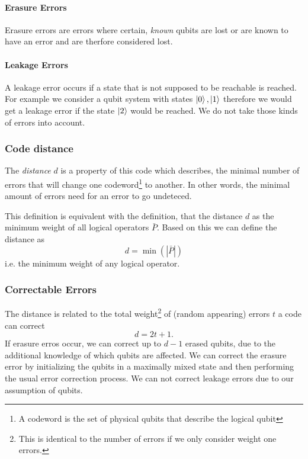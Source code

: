 \paragraph{Erasure Errors}
Erasure errors are errors where certain, \textit{known} qubits are lost or are known to have an error 
and are therfore considered lost. \cite{QECmemory}

\paragraph{Leakage Errors}
A leakage error occurs if a state that is not supposed to be reachable is reached. 
For example we consider a qubit system with states $\ket{0},\ket{1}$ therefore we would get a leakage error 
if the state $\ket{2}$ would be reached.
We do not take those kinds of errors into account.


\subsubsection{Code distance}\label{sec:code_distance}
The \textit{distance} $d$ is a property of this code which describes, 
the minimal number of errors that will change one 
codeword\footnote{A codeword is the set of physical qubits that describe the logical qubit} to another.
In other words, the minimal amount of errors need for an error to go undeteced. \cite{QECintro}

This definition is equivalent with the definition, 
that the distance $d$ as the minimum weight of all logical operators $\bar{P}$. 
Based on this we can define the distance as
\begin{equation}
    d = \min( |\bar{P}| )
\end{equation}
i.e. the minimum weight of any logical operator.\cite{QECmemory}


\subsubsection{Correctable Errors}
The distance is related to the total weight\footnote{
    This is identical to the number of errors if we only consider weight one errors.
    } of (random appearing) errors $t$ a code can correct \cite{QECintro}
\begin{equation}
    d = 2t+1.
\end{equation}
If erasure erros occur, we can correct up to $d-1$ erased qubits, 
due to the additional knowledge of which qubits are affected. 
We can correct the erasure error by initializing the qubits in a maximally mixed state 
and then performing the usual error correction process.\cite{QECmemory}
We can not correct leakage errors due to our assumption of qubits.


